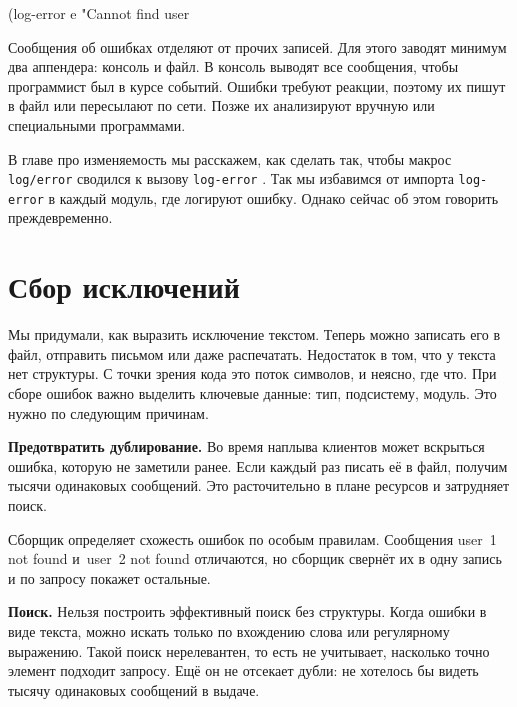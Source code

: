 \else

\begin{english}
  \begin{clojure}
(log-error e "Cannot find user %
  \end{clojure}
\end{english}

\fi

Сообщения об ошибках отделяют от прочих записей. Для этого заводят минимум два
аппендера: консоль и файл. В консоль выводят все сообщения, чтобы программист
был в курсе событий. Ошибки требуют реакции, поэтому их пишут в файл или
пересылают по сети. Позже их анализируют вручную или специальными программами.

В главе про изменяемость мы расскажем, как сделать так, чтобы макрос
\verb|log/error| сводился к вызову \verb|log-error| .
Так мы избавимся от импорта \verb|log-error| в каждый модуль, где логируют ошибку.
Однако сейчас об этом говорить преждевременно.

\section{Сбор исключений}


Мы придумали, как выразить исключение текстом. Теперь можно записать его в файл,
отправить письмом или даже распечатать. Недостаток в том, что у текста нет
структуры. С точки зрения кода это поток символов, и неясно, где что. При сборе
ошибок важно выделить ключевые данные: тип, подсистему, модуль. Это нужно по
следующим причинам.

\textbf{Предотвратить дублирование.} Во время наплыва клиентов может вскрыться
ошибка, которую не заметили ранее. Если каждый раз писать её в файл, получим
тысячи одинаковых сообщений. Это расточительно в плане ресурсов и затрудняет
поиск.

Сборщик определяет схожесть ошибок по особым правилам. Сообщения user~1 not
found и~user~2 not found отличаются, но сборщик свернёт их в одну
запись и по запросу покажет остальные.

\textbf{Поиск.} Нельзя построить эффективный поиск без структуры. Когда ошибки в
виде текста, можно искать только по вхождению слова или регулярному
выражению. Такой поиск нерелевантен, то есть не учитывает, насколько точно
элемент подходит запросу. Ещё он не отсекает дубли: не хотелось бы видеть тысячу
одинаковых сообщений в выдаче.

